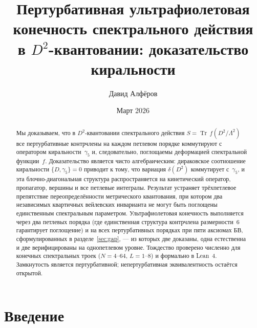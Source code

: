 \documentclass[12pt,a4paper]{article}
\theoremstyle{definition}
\theoremstyle{remark}
\newcommand{\Tr}{\operatorname{Tr}}
\newcommand{\Lam}{\Lambda}
\begin{document}
\title{Пертурбативная ультрафиолетовая конечность спектрального действия\\
в $D^2$-квантовании: доказательство киральности}

\author{Давид Алфёров}

\date{Март 2026}

\maketitle

\begin{abstract}

Мы доказываем, что в $D^2$-квантовании спектрального действия
$S = \Tr\,f(D^2/\Lam^2)$ все пертурбативные контрчлены на каждом
петлевом порядке коммутируют с оператором киральности~$\gamma_5$ и,
следовательно, поглощаемы деформацией спектральной функции~$f$.
Доказательство является чисто алгебраическим: дираковское соотношение
киральности $\{D, \gamma_5\} = 0$ приводит к тому, что вариация
$\delta(D^2)$ коммутирует с~$\gamma_5$, и эта блочно-диагональная
структура распространяется на кинетический оператор, пропагатор,
вершины и все петлевые интегралы.  Результат устраняет трёхпетлевое
препятствие переопределённости метрического квантования, при котором два
независимых квартичных вейлевских инварианта не могут быть поглощены
единственным спектральным параметром.
Ультрафиолетовая конечность выполняется через два петлевых порядка
(где единственная структура контрчлена размерности~6 гарантирует
поглощение) и на всех пертурбативных порядках при пяти аксиомах БВ,
сформулированных в разделе~\ref{sec:gap}, --- из которых две доказаны,
одна естественна и две верифицированы на однопетлевом уровне.
Тождество проверено численно для конечных спектральных троек
($N = 4$--$64$, $L = 1$--$8$) и формально в Lean~4.  Замкнутость
является пертурбативной; непертурбативная эквивалентность остаётся
открытой.

\end{abstract}

\tableofcontents
\newpage

\section{Введение}
\label{sec:intro}
\end{document}
